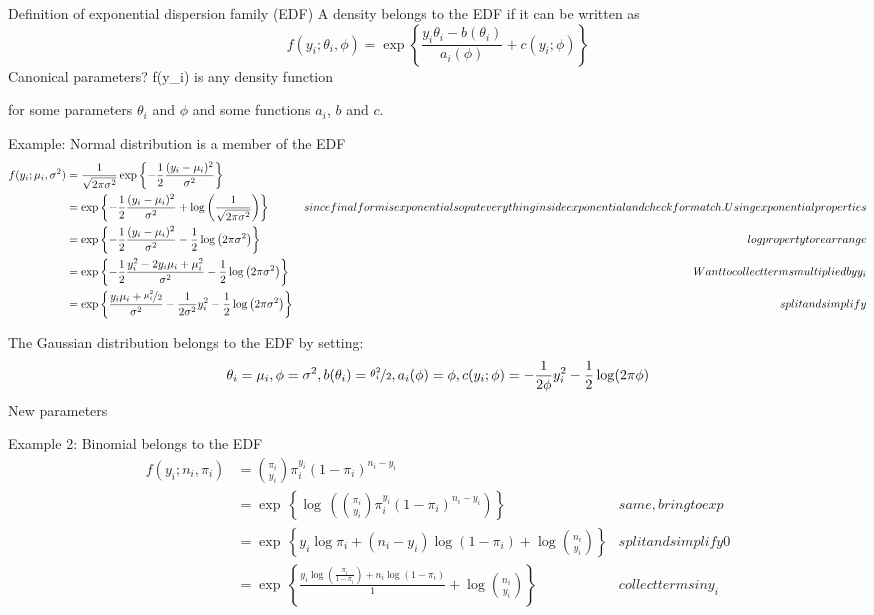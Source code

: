 Definition of exponential dispersion family (EDF)
A density belongs to the EDF if it can be written as
$$
  f(y_i; \theta_i, \phi) = 
  \exp\left\{\frac{y_i\theta_i - b(\theta_i)}{a_i(\phi)} + c(y_i; \phi)\right\}
$$
Canonical parameters?
f(y_i) is any density function 

for some parameters $\theta_i$ and $\phi$ and some functions $a_i$, $b$ and $c$.

Example: Normal distribution is a member of the EDF
\begin{align*}
f(y_i; \mu_i, \sigma^2)
  &= \frac{1}{\sqrt{2\pi\sigma^2}} \exp\left\{-\frac{1}{2} \frac{(y_i-\mu_i)^2}{\sigma^2}\right\}
  & \\
  &= \exp\left\{-\frac{1}{2} \frac{(y_i-\mu_i)^2}{\sigma^2} + \log\left(\frac{1}{\sqrt{2\pi\sigma^2}}\right)\right\}
  & since final form is exponential so put everything inside exponential and check for match. Using exponential properties\\
  &= \exp\left\{-\frac{1}{2} \frac{(y_i-\mu_i)^2}{\sigma^2} -\frac{1}{2}\log\left(2\pi\sigma^2\right)\right\}
  & log property to rearrange\\
  &= \exp\left\{-\frac{1}{2} \frac{y_i^2-2y_i\mu_i+\mu_i^2}{\sigma^2} -\frac{1}{2}\log\left(2\pi\sigma^2\right)\right\}
  & Want to collect terms multiplied by y_i\\
  &= \exp\left\{\frac{y_i\mu_i+\nicefrac{\mu_i^2}{2}}{\sigma^2} - \frac{1}{2\sigma^2}y_i^2 - \frac{1}{2}\log\left(2\pi\sigma^2\right)\right\}
  & split and simplify\\
\end{align*}

The Gaussian distribution belongs to the EDF by setting:
\begin{align*}
  \theta_i = \mu_i, \phi = \sigma^2, b(\theta_i) = \nicefrac{\theta_i^2}{2}, a_i(\phi) = \phi, c(y_i; \phi) = - \frac{1}{2\phi} y_i^2 - \frac{1}{2}\log(2\pi\phi)
\end{align*}
New parameters

Example 2: Binomial belongs to the EDF
\begin{align*} %
f(y_i; n_i, \pi_i)
  &= \binom{\pi_i}{y_i}\pi_i^{y_i}(1-\pi_i)^{n_i-y_i}
  & \\
  &= \exp\,\left\{\log\,\left(\binom{\pi_i}{y_i}\pi_i^{y_i}(1-\pi_i)^{n_i-y_i}\right)\right\}
  & same, bring to exp \\
  &= \exp\,\left\{y_i\log\pi_i+(n_i-y_i)\log(1-\pi_i)+\log\binom{n_i}{y_i}\right\}
  &  split and simplify0\\
  &= \exp\,\left\{\frac{y_i\log\left(\frac{\pi_i}{1-\pi_i}\right)+n_i\log(1-\pi_i)}{1}+\log\binom{n_i}{y_i}\right\}
  & collect terms in y_i\\
\end{align*}

